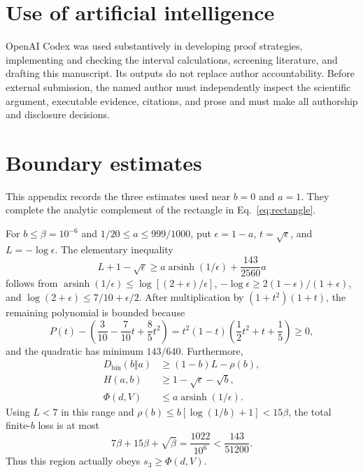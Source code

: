 \documentclass[aps,pra,reprint,superscriptaddress,nofootinbib,longbibliography,floatfix]{revtex4-2}
\newcommand{\asinh}{\operatorname{arsinh}}
\newcommand{\Dkl}{D_{\mathrm{bin}}}
\newcommand{\PhiF}{\Phi}
\begin{document}
\section*{Use of artificial intelligence}

OpenAI Codex was used substantively in developing proof strategies, implementing and checking the interval calculations, screening literature, and drafting this manuscript.  Its outputs do not replace author accountability.  Before external submission, the named author must independently inspect the scientific argument, executable evidence, citations, and prose and must make all authorship and disclosure decisions.

\appendix

\section{Boundary estimates}
\label{app:boundaries}

This appendix records the three estimates used near $b=0$ and $a=1$.  They complete the analytic complement of the rectangle in Eq.~\eqref{eq:rectangle}.

For $b\leq\beta=10^{-6}$ and $1/20\leq a\leq999/1000$, put $\epsilon=1-a$, $t=\sqrt\epsilon$, and $L=-\log\epsilon$.  The elementary inequality
\begin{equation}
 L+1-\sqrt\epsilon\geq
 a\asinh(1/\epsilon)+\frac{143}{2560}a
 \label{eq:tiny-b-key}
\end{equation}
follows from $\asinh(1/\epsilon)\leq\log[(2+\epsilon)/\epsilon]$, $-\log\epsilon\geq2(1-\epsilon)/(1+\epsilon)$, and $\log(2+\epsilon)\leq7/10+\epsilon/2$.  After multiplication by $(1+t^2)(1+t)$, the remaining polynomial is bounded because
\begin{equation}
 P(t)-\left(\frac3{10}-\frac7{10}t+\frac85t^2\right)
 =t^2(1-t)\left(\frac12t^2+t+\frac15\right)\geq0,
\end{equation}
and the quadratic has minimum $143/640$.  Furthermore,
\begin{align}
 \Dkl(b\Vert a)&\geq(1-b)L-\rho(b),\\
 H(a,b)&\geq1-\sqrt\epsilon-\sqrt b,\\
 \PhiF(d,V)&\leq a\asinh(1/\epsilon).
\end{align}
Using $L<7$ in this range and $\rho(b)\leq b[\log(1/b)+1]<15\beta$, the total finite-$b$ loss is at most
\begin{equation}
 7\beta+15\beta+\sqrt\beta=\frac{1022}{10^6}
 <\frac{143}{51200}.
\end{equation}
Thus this region actually obeys $s_3\geq\PhiF(d,V)$.
\end{document}
